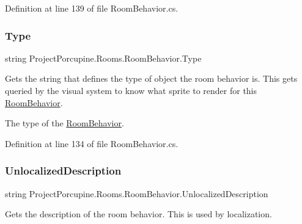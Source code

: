 Definition at line 139 of file Room\+Behavior.\+cs.

\mbox{\label{class_project_porcupine_1_1_rooms_1_1_room_behavior_a7b19b205c62a475bc5d70aecba6d0eb9}} 
\subsubsection{\texorpdfstring{Type}{Type}}
{\footnotesize\ttfamily string Project\+Porcupine.\+Rooms.\+Room\+Behavior.\+Type\hspace{0.3cm}{\ttfamily [get]}}



Gets the string that defines the type of object the room behavior is. This gets queried by the visual system to know what sprite to render for this \hyperlink{class_project_porcupine_1_1_rooms_1_1_room_behavior}{Room\+Behavior}. 

The type of the \hyperlink{class_project_porcupine_1_1_rooms_1_1_room_behavior}{Room\+Behavior}.

Definition at line 134 of file Room\+Behavior.\+cs.

\mbox{\label{class_project_porcupine_1_1_rooms_1_1_room_behavior_aeb1f7869f4a6ab5600a9320acf2978f3}} 
\subsubsection{\texorpdfstring{Unlocalized\+Description}{UnlocalizedDescription}}
{\footnotesize\ttfamily string Project\+Porcupine.\+Rooms.\+Room\+Behavior.\+Unlocalized\+Description\hspace{0.3cm}{\ttfamily [get]}}



Gets the description of the room behavior. This is used by localization. 



